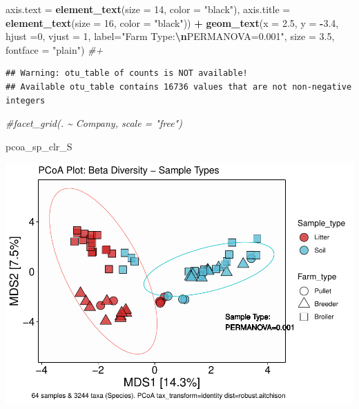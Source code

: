 \documentclass[
]{article}
\newenvironment{Shaded}{\begin{snugshade}}{\end{snugshade}}
\newcommand{\AttributeTok}[1]{\textcolor[rgb]{0.13,0.29,0.53}{#1}}
\newcommand{\CommentTok}[1]{\textcolor[rgb]{0.56,0.35,0.01}{\textit{#1}}}
\newcommand{\DecValTok}[1]{\textcolor[rgb]{0.00,0.00,0.81}{#1}}
\newcommand{\FloatTok}[1]{\textcolor[rgb]{0.00,0.00,0.81}{#1}}
\newcommand{\FunctionTok}[1]{\textcolor[rgb]{0.13,0.29,0.53}{\textbf{#1}}}
\newcommand{\NormalTok}[1]{#1}
\newcommand{\SpecialCharTok}[1]{\textcolor[rgb]{0.81,0.36,0.00}{\textbf{#1}}}
\newcommand{\StringTok}[1]{\textcolor[rgb]{0.31,0.60,0.02}{#1}}
\begin{document}
\begin{Shaded}
\begin{Highlighting}[]
        \AttributeTok{axis.text =} \FunctionTok{element\_text}\NormalTok{(}\AttributeTok{size =} \DecValTok{14}\NormalTok{,}
                                 \AttributeTok{color =} \StringTok{"black"}\NormalTok{),}
        \AttributeTok{axis.title =} \FunctionTok{element\_text}\NormalTok{(}\AttributeTok{size =} \DecValTok{16}\NormalTok{,}
                                  \AttributeTok{color =} \StringTok{"black"}\NormalTok{)) }\SpecialCharTok{+}
  \FunctionTok{geom\_text}\NormalTok{(}\AttributeTok{x =} \FloatTok{2.5}\NormalTok{, }
            \AttributeTok{y =} \SpecialCharTok{{-}}\FloatTok{3.4}\NormalTok{, }
            \AttributeTok{hjust =}\DecValTok{0}\NormalTok{,}
            \AttributeTok{vjust =} \DecValTok{1}\NormalTok{,}
            \AttributeTok{label=}\StringTok{"Farm Type:}\SpecialCharTok{\textbackslash{}n}\StringTok{PERMANOVA=0.001"}\NormalTok{,}
            \AttributeTok{size =} \FloatTok{3.5}\NormalTok{,}
            \AttributeTok{fontface =} \StringTok{"plain"}\NormalTok{) }\CommentTok{\#+}
\end{Highlighting}
\end{Shaded}

\begin{verbatim}
## Warning: otu_table of counts is NOT available!
## Available otu_table contains 16736 values that are not non-negative integers
\end{verbatim}

\begin{Shaded}
\begin{Highlighting}[]
  \CommentTok{\#facet\_grid(. \textasciitilde{} Company, scale = "free")}
\end{Highlighting}
\end{Shaded}

\begin{Shaded}
\begin{Highlighting}[]
\NormalTok{pcoa\_sp\_clr\_S}
\end{Highlighting}
\end{Shaded}

\includegraphics{Final_Project_Pankaj_files/figure-latex/drawing PCoA plots-1.pdf}
\end{document}
